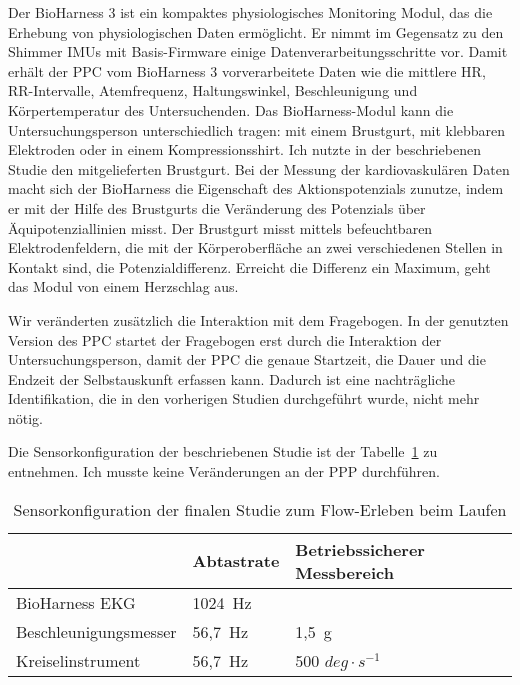 Der BioHarness 3 ist ein kompaktes physiologisches Monitoring Modul, das die Erhebung von physiologischen Daten ermöglicht. Er nimmt im Gegensatz zu den Shimmer \acp{IMU} mit Basis-Firmware einige Datenverarbeitungsschritte vor. Damit erhält der \ac{PPC} vom BioHarness 3 vorverarbeitete Daten wie die mittlere \ac{HR}, RR-Intervalle, Atemfrequenz, Haltungswinkel, Beschleunigung und Körpertemperatur des Untersuchenden. Das BioHarness-Modul kann die Untersuchungsperson unterschiedlich tragen: mit einem Brustgurt, mit klebbaren Elektroden oder in einem Kompressionsshirt. Ich nutzte in der beschriebenen Studie den mitgelieferten Brustgurt. Bei der Messung der kardiovaskulären Daten macht sich der BioHarness die Eigenschaft des Aktionspotenzials zunutze, indem er mit der Hilfe des Brustgurts die Veränderung des Potenzials über Äquipotenziallinien misst. Der Brustgurt misst mittels befeuchtbaren Elektrodenfeldern, die mit der Körperoberfläche an zwei verschiedenen Stellen in Kontakt sind, die Potenzialdifferenz. Erreicht die Differenz ein Maximum, geht das Modul von einem Herzschlag aus. 

Wir veränderten zusätzlich die Interaktion mit dem Fragebogen. In der genutzten Version des \ac{PPC} startet der Fragebogen erst durch die Interaktion der Untersuchungsperson, damit der \ac{PPC} die genaue Startzeit, die Dauer und die Endzeit der Selbstauskunft erfassen kann. Dadurch ist eine nachträgliche Identifikation, die in den vorherigen Studien durchgeführt wurde, nicht mehr nötig. 

Die Sensorkonfiguration der beschriebenen Studie ist der Tabelle~\ref{tab:sensorkonfiguration_3} zu entnehmen. Ich musste keine Veränderungen an der \ac{PPP} durchführen. 
\begin{table}
	[!htb] \caption[Sensorkonfiguration der finalen Studie zum Flow-Erleben beim Laufen]{Sensorkonfiguration der finalen Studie zum Flow-Erleben beim Laufen} \label{tab:sensorkonfiguration_3} 
	\begin{tabularx}
		{ 
		\textwidth}{p{} p{} p{}} \toprule & Abtastrate & Betriebssicherer Messbereich \\
		\midrule BioHarness EKG & 1024~Hz & \\
		Beschleunigungsmesser & 56,7~Hz & 1,5~g \\
		Kreiselinstrument & 56,7~Hz & 500 $deg \cdot s^{-1}$ \\
		\bottomrule 
	\end{tabularx}
\end{table}

